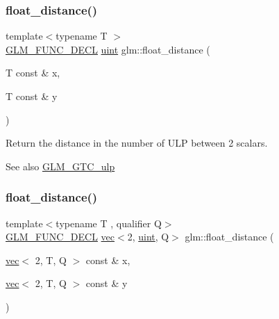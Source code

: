 \subsubsection{\texorpdfstring{float\+\_\+distance()}{float\_distance()}\hspace{0.1cm}{\footnotesize\ttfamily [1/2]}}
{\footnotesize\ttfamily template$<$typename T $>$ \\
\mbox{\hyperlink{setup_8hpp_ab2d052de21a70539923e9bcbf6e83a51}{G\+L\+M\+\_\+\+F\+U\+N\+C\+\_\+\+D\+E\+CL}} \mbox{\hyperlink{group__core__precision_ga4fd29415871152bfb5abd588334147c8}{uint}} glm\+::float\+\_\+distance (\begin{DoxyParamCaption}\item[{T const \&}]{x,  }\item[{T const \&}]{y }\end{DoxyParamCaption})}

Return the distance in the number of U\+LP between 2 scalars. \begin{DoxySeeAlso}{See also}
\mbox{\hyperlink{group__gtc__ulp}{G\+L\+M\+\_\+\+G\+T\+C\+\_\+ulp}} 
\end{DoxySeeAlso}
\mbox{\label{group__gtc__ulp_ga72b3223069013f336d8c31812b7ada80}} 
\subsubsection{\texorpdfstring{float\+\_\+distance()}{float\_distance()}\hspace{0.1cm}{\footnotesize\ttfamily [2/2]}}
{\footnotesize\ttfamily template$<$typename T , qualifier Q$>$ \\
\mbox{\hyperlink{setup_8hpp_ab2d052de21a70539923e9bcbf6e83a51}{G\+L\+M\+\_\+\+F\+U\+N\+C\+\_\+\+D\+E\+CL}} \mbox{\hyperlink{structglm_1_1vec}{vec}}$<$2, \mbox{\hyperlink{group__core__precision_ga4fd29415871152bfb5abd588334147c8}{uint}}, Q$>$ glm\+::float\+\_\+distance (\begin{DoxyParamCaption}\item[{\mbox{\hyperlink{structglm_1_1vec}{vec}}$<$ 2, T, Q $>$ const \&}]{x,  }\item[{\mbox{\hyperlink{structglm_1_1vec}{vec}}$<$ 2, T, Q $>$ const \&}]{y }\end{DoxyParamCaption})}

